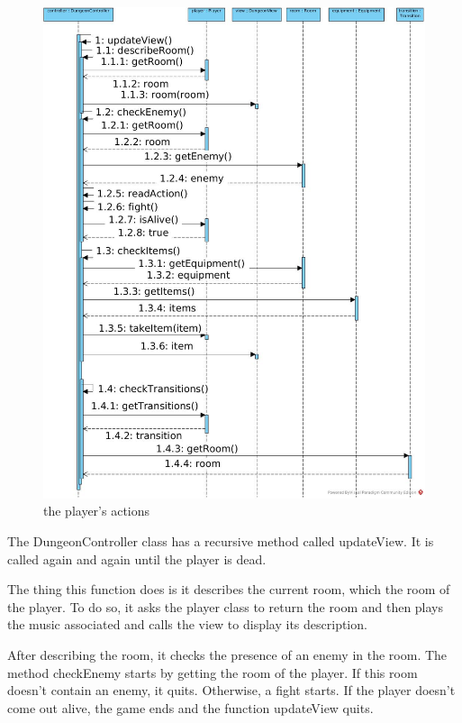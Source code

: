 \documentclass[11pt]{extarticle}
\begin{document}
\begin{figure}[h]
    \centering
    
    \caption{the player's actions}
    \label{playersActions}
    \includegraphics[scale = 0.34]{player's actions}
\end{figure}

The DungeonController class has a recursive method called updateView. It is called again and again until the player is dead. 

The thing this function does is it describes the current room, which the room of the player. To do so, it asks the player class to return the room and then plays the music associated and calls the view to display its description.

After describing the room, it checks the presence of an enemy in the room. The method checkEnemy starts by getting the room of the player. If this room doesn't contain an enemy, it quits. Otherwise, a fight starts. If the player doesn't come out alive, the game ends and the function updateView quits. 
\end{document}
